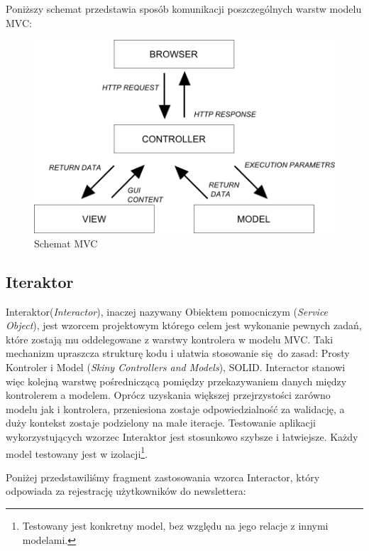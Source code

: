     Poniższy schemat przedstawia sposób komunikacji poszczególnych warstw modelu MVC:
    \begin{figure}[h]
      \centering
      \includegraphics[scale=0.87]{images/mvc_model.png}
      \caption{Schemat MVC}
    \end{figure}
  \subsection{Iteraktor}
  Interaktor\cite{interactors}(\emph{Interactor}), inaczej nazywany Obiektem pomocniczym (\emph{Service Object}), jest wzorcem projektowym którego celem jest wykonanie pewnych zadań, które zostają mu oddelegowane z warstwy kontrolera w modelu MVC. Taki mechanizm upraszcza strukturę kodu i ułatwia stosowanie się do zasad: Prosty Kontroler i Model (\emph{Skiny Controllers and Models}), SOLID.
  Interactor stanowi więc kolejną warstwę pośredniczącą pomiędzy przekazywaniem danych między kontrolerem a modelem. Oprócz uzyskania większej przejrzystości zarówno modelu jak i kontrolera, przeniesiona zostaje odpowiedzialność za walidację, a duży kontekst zostaje podzielony na małe iteracje. Testowanie aplikacji wykorzystujących wzorzec Interaktor jest stosunkowo szybsze i łatwiejsze. Każdy model testowany jest w izolacji\footnote{Testowany jest konkretny model, bez względu na jego relacje z innymi modelami.}.

  Poniżej przedstawiliśmy fragment zastosowania wzorca Interactor, który odpowiada za rejestrację użytkowników do newslettera:\\
  
